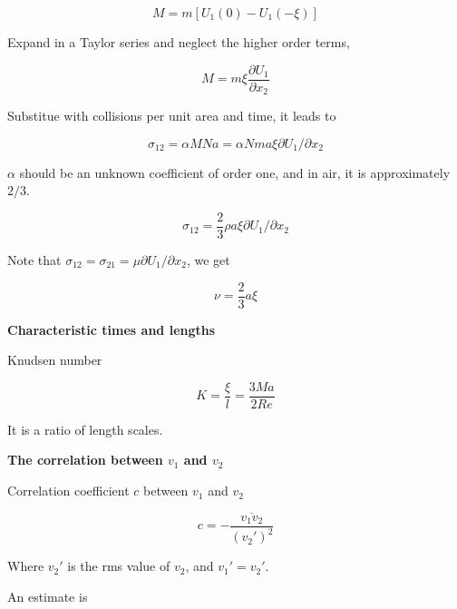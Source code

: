 \documentclass{article}
\begin{document}
\begin{equation*}
    M=m\left[U_1(0)-U_1(-\xi)\right]
\end{equation*}

Expand in a Taylor series and neglect the higher order terms,

\begin{equation*}
    M=m\xi\frac{\partial U_1}{\partial x_2}
\end{equation*}

Substitue with collisions per unit area and time, it leads to

\begin{equation*}
    \sigma_{12}=\alpha MNa=\alpha Nma\xi \partial U_1/\partial x_2
\end{equation*}

$\alpha$ should be an unknown coefficient of order one, and in air, it is approximately $2/3$.

\begin{equation*}
    \sigma_{12}=\frac{2}{3}\rho a\xi \partial U_1/\partial x_2
\end{equation*}

Note that $\sigma_{12}=\sigma_{21}=\mu\partial U_1/\partial x_2$, we get

\begin{equation*}
    \nu=\frac{2}{3}a\xi
\end{equation*}

%

\textbf{Characteristic times and lengths}

Knudsen number

\begin{equation*}
    K=\frac{\xi}{l}=\frac{3Ma}{2Re}
\end{equation*}

It is a ratio of length scales.

\textbf{The correlation between $v_1$ and $v_2$}

Correlation coefficient $c$ between $v_1$ and $v_2$

\begin{equation*}
    c=-\frac{\overline{v_1v_2}}{(v_2')^2}
\end{equation*}

Where $v_2'$ is the rms value of $v_2$, and $v_1'=v_2'$.

An estimate is
\end{document}
